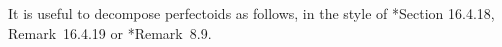 \epp



It is useful to decompose perfectoids as follows, in the style of \cite{GR18}*{Section 16.4.18, Remark~16.4.19} or \cite{Lau18}*{Remark~8.9}.

